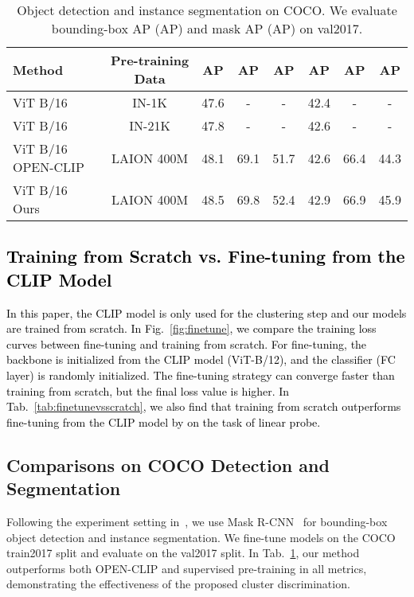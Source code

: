 \documentclass{article} \usepackage{iclr2023_conference,times}
\begin{document}
\begin{table}[t]
	\caption {Object detection and instance segmentation on COCO. We evaluate bounding-box AP (AP) and mask AP (AP) on val2017.}
	\label{tbl:coco}
	\centering
	\begin{tabular}	{l  |c|  c  c  c | c  c  c}
		\toprule
		Method                           & Pre-training Data & AP & AP & AP & AP & AP & AP \\
		\midrule
		ViT B/16 \citep{li2022exploring} & IN-1K             & 47.6           & -                   & -                   & 42.4           & -                   & -                   \\
		ViT B/16 \citep{li2022exploring} & IN-21K            & 47.8           & -                   & -                   & 42.6           & -                   & -                   \\
		ViT B/16 OPEN-CLIP               & LAION 400M        & 48.1           & 69.1                & 51.7                & 42.6           & 66.4                & 44.3                \\
		ViT B/16 Ours                    & LAION 400M        & 48.5           & 69.8                & 52.4                & 42.9           & 66.9                & 45.9                \\
		\bottomrule
	\end{tabular}
\end{table}
\subsection{\textcolor{black}{Training from Scratch vs. Fine-tuning from the CLIP Model}}
\textcolor{black}{
In this paper, the CLIP model is only used for the clustering step and our models are trained from scratch. In Fig.~\ref{fig:finetune}, we compare the training loss curves between fine-tuning and training from scratch. For fine-tuning, the backbone is initialized from the CLIP model (ViT-B/12), and the classifier (FC layer) is randomly initialized. The fine-tuning strategy can converge faster than training from scratch, but the final loss value is higher. In Tab.~\ref{tab:finetunevsscratch}, we also find that training from scratch outperforms fine-tuning from the CLIP model by  on the task of linear probe.}

\subsection{Comparisons on COCO Detection and Segmentation}
Following the experiment setting in~\citep{li2022exploring}, we use Mask R-CNN~\citep{he2017mask} for bounding-box object detection and instance segmentation.
We fine-tune models on the COCO~\citep{lin2014microsoft} train2017 split and evaluate on the val2017 split.  
In Tab.~\ref{tbl:coco}, our method outperforms both OPEN-CLIP and supervised pre-training in all metrics, demonstrating the effectiveness of the proposed cluster discrimination.
\end{document}
